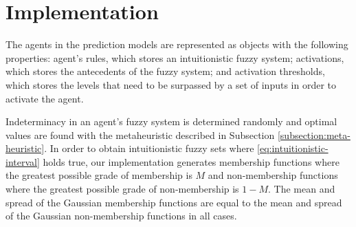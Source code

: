 ﻿\documentclass{ieeeaccess}
\begin{document}




\section{Implementation}
\label{section:implementation}

The agents in the prediction models are represented as objects with
the following properties: agent's rules, which stores an
intuitionistic fuzzy system; activations, which stores the antecedents
of the fuzzy system; and activation thresholds, which stores the
levels that need to be surpassed by a set of inputs in order to
activate the agent.

Indeterminacy in an agent's fuzzy system is determined randomly and
optimal values are found with the metaheuristic described in
Subsection \ref{subsection:meta-heuristic}. In order to obtain
intuitionistic fuzzy sets where \ref{eq:intuitionistic-interval} holds
true, our implementation generates membership functions where the
greatest possible grade of membership is $M$ and non-membership
functions where the greatest possible grade of non-membership is $1 -
M$. The mean and spread of the Gaussian membership functions are
equal to the mean and spread of the Gaussian non-membership functions
in all cases.
\end{document}
